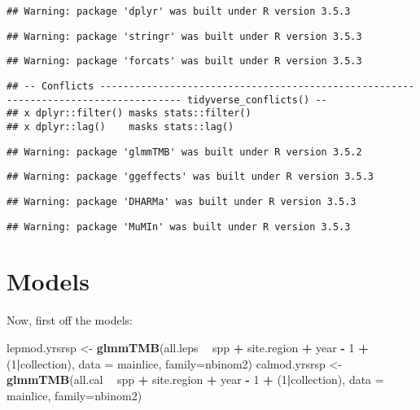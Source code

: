 \documentclass[]{article}
\newenvironment{Shaded}{\begin{snugshade}}{\end{snugshade}}
\newcommand{\KeywordTok}[1]{\textcolor[rgb]{0.13,0.29,0.53}{\textbf{#1}}}
\newcommand{\DataTypeTok}[1]{\textcolor[rgb]{0.13,0.29,0.53}{#1}}
\newcommand{\DecValTok}[1]{\textcolor[rgb]{0.00,0.00,0.81}{#1}}
\newcommand{\StringTok}[1]{\textcolor[rgb]{0.31,0.60,0.02}{#1}}
\newcommand{\OperatorTok}[1]{\textcolor[rgb]{0.81,0.36,0.00}{\textbf{#1}}}
\newcommand{\NormalTok}[1]{#1}
\begin{document}
\begin{verbatim}
## Warning: package 'dplyr' was built under R version 3.5.3
\end{verbatim}

\begin{verbatim}
## Warning: package 'stringr' was built under R version 3.5.3
\end{verbatim}

\begin{verbatim}
## Warning: package 'forcats' was built under R version 3.5.3
\end{verbatim}

\begin{verbatim}
## -- Conflicts ------------------------------------------------------------------------------------ tidyverse_conflicts() --
## x dplyr::filter() masks stats::filter()
## x dplyr::lag()    masks stats::lag()
\end{verbatim}

\begin{verbatim}
## Warning: package 'glmmTMB' was built under R version 3.5.2
\end{verbatim}

\begin{verbatim}
## Warning: package 'ggeffects' was built under R version 3.5.3
\end{verbatim}

\begin{verbatim}
## Warning: package 'DHARMa' was built under R version 3.5.3
\end{verbatim}

\begin{verbatim}
## Warning: package 'MuMIn' was built under R version 3.5.3
\end{verbatim}

\section{Models}\label{models}

Now, first off the models:

\begin{Shaded}
\begin{Highlighting}[]
\NormalTok{lepmod.yrsrsp <-}\StringTok{ }\KeywordTok{glmmTMB}\NormalTok{(all.leps }\OperatorTok{~}\StringTok{ }\NormalTok{spp }\OperatorTok{+}\StringTok{ }\NormalTok{site.region }\OperatorTok{+}\StringTok{ }\NormalTok{year }\OperatorTok{-}\StringTok{ }\DecValTok{1} \OperatorTok{+}\StringTok{ }\NormalTok{(}\DecValTok{1}\OperatorTok{|}\NormalTok{collection), }
                      \DataTypeTok{data =}\NormalTok{ mainlice, }\DataTypeTok{family=}\NormalTok{nbinom2)}
\NormalTok{calmod.yrsrsp <-}\StringTok{ }\KeywordTok{glmmTMB}\NormalTok{(all.cal }\OperatorTok{~}\StringTok{ }\NormalTok{spp }\OperatorTok{+}\StringTok{ }\NormalTok{site.region }\OperatorTok{+}\StringTok{ }\NormalTok{year }\OperatorTok{-}\StringTok{ }\DecValTok{1} \OperatorTok{+}\StringTok{ }\NormalTok{(}\DecValTok{1}\OperatorTok{|}\NormalTok{collection), }
                      \DataTypeTok{data =}\NormalTok{ mainlice, }\DataTypeTok{family=}\NormalTok{nbinom2)}
\end{Highlighting}
\end{Shaded}
\end{document}
